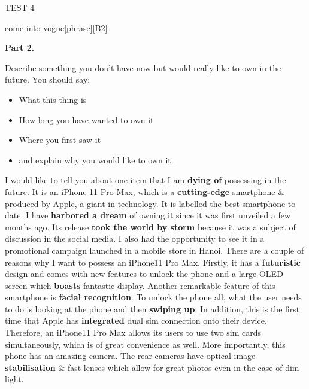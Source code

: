 \begin{glossarymc}[Cambridge 10]
\begin{test}{TEST 4}
\begin{VocabExplain}[Part 1]
            \begin{ExplainCard}{come into vogue}[phrase][B2]
            \end{ExplainCard}
        \end{VocabExplain}

    \noindent
    \textbf{Part 2.}
    \begin{qa}{Describe something you don't have now but would really like to own in the future. You should say:}
    \begin{itemize}
    \item What this thing is
    \item How long you have wanted to own it
    \item Where you first saw it
    \item and explain why you would like to own it.
    \end{itemize}

    I would like to tell you about one item that I am \textbf{dying of} possessing in the future. It is an iPhone 11 Pro Max, which is a \textbf{cutting-edge} smartphone \& produced by Apple, a giant in technology. It is labelled the best smartphone to date. I have \textbf{harbored a dream} of owning it since it was first unveiled a few months ago. Its release \textbf{took the world by storm} because it was a subject of discussion in the social media. I also had the opportunity to see it in a promotional campaign launched in a mobile store in Hanoi. There are a couple of reasons why I want to possess an iPhone11 Pro Max. Firstly, it has a \textbf{futuristic} design and comes with new features to unlock the phone and a large OLED screen which \textbf{boasts} fantastic display. Another remarkable feature of this smartphone is \textbf{facial recognition}. To unlock the phone all, what the user needs to do is looking at the phone and then \textbf{swiping up}. In addition, this is the first time that Apple has \textbf{integrated} dual sim connection onto their device. Therefore, an iPhone11 Pro Max allows its users to use two sim cards simultaneously, which is of great convenience as well. More importantly, this phone has an amazing camera. The rear cameras have optical image \textbf{stabilisation} \& fast lenses which allow for great photos even in the case of dim light.
    \end{qa}


\end{test}
\end{glossarymc}
